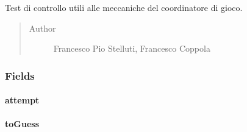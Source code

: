 \documentclass[letterpaper,10pt,italian,openany,oneside]{sphinxmanual}
\begin{document}
\begin{fulllineitems}
\label{\detokenize{test/it/unicam/cs/pa/mastermind/test/GameCoreBoardControllerTest:it.unicam.cs.pa.mastermind.test.GameCoreBoardControllerTest}}
Test di controllo utili alle meccaniche del coordinatore di gioco.
\begin{quote}\begin{description}
\item[{Author}] \leavevmode
Francesco Pio Stelluti, Francesco Coppola

\end{description}\end{quote}

\end{fulllineitems}



\subsubsection{Fields}
\label{\detokenize{test/it/unicam/cs/pa/mastermind/test/GameCoreBoardControllerTest:fields}}

\paragraph{attempt}
\label{\detokenize{test/it/unicam/cs/pa/mastermind/test/GameCoreBoardControllerTest:attempt}}

\begin{fulllineitems}
\label{\detokenize{test/it/unicam/cs/pa/mastermind/test/GameCoreBoardControllerTest:it.unicam.cs.pa.mastermind.test.GameCoreBoardControllerTest.attempt}}
\end{fulllineitems}



\paragraph{toGuess}
\label{\detokenize{test/it/unicam/cs/pa/mastermind/test/GameCoreBoardControllerTest:toguess}}
\end{document}
